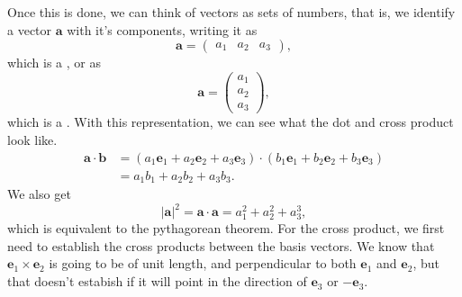 \documentclass[a4]{scrreprt}
\begin{document}
Once this is done, we can think of vectors as sets of numbers, that is, we identify a vector $\mathbf{a}$ with it's components, writing it as
$$
\mathbf{a} = \begin{pmatrix}
	a_1 & a_2 & a_3
\end{pmatrix},
$$
which is a , or as
$$
\mathbf{a} = \begin{pmatrix}
	a_1 \\ a_2 \\ a_3
\end{pmatrix},
$$
which is a .
With this representation, we can see what the dot and cross product look like.
\begin{align*}
	\mathbf{a} \cdot \mathbf{b} &= (a_1 \mathbf{e}_1 + a_2 \mathbf{e}_2 + a_3 \mathbf{e}_3) \cdot (b_1 \mathbf{e}_1 + b_2 \mathbf{e}_2 + b_3 \mathbf{e}_3)\\
	&= a_1 b_1 + a_2 b_2 + a_3 b_3.
\end{align*}
We also get
$$
|\mathbf{a}|^2 = \mathbf{a} \cdot \mathbf{a} = a_1^2 + a_2 ^2 + a_3^3,
$$
which is equivalent to the pythagorean theorem.
For the cross product, we first need to establish the cross products between the basis vectors.
We know that $\mathbf{e}_1 \times \mathbf{e}_2$ is going to be of unit length, and perpendicular to both $\mathbf{e}_1$ and $\mathbf{e}_2$, but that doesn't estabish if it will point in the direction of $\mathbf{e}_3$ or $-\mathbf{e}_3$.
\end{document}
